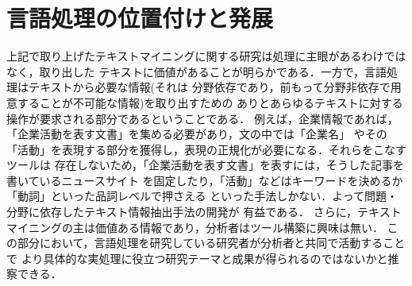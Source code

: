 \documentclass[twocolumn]{jarticle}
\begin{document}
\section{言語処理の位置付けと発展}
上記で取り上げたテキストマイニングに関する研究は処理に主眼があるわけではなく，取り出した
テキストに価値があることが明らかである．一方で，言語処理はテキストから必要な情報(それは
分野依存であり，前もって分野非依存で用意することが不可能な情報)を取り出すための
ありとあらゆるテキストに対する操作が要求される部分であるということである．
例えば，企業情報であれば，「企業活動を表す文書」を集める必要があり，文の中では「企業名」
やその「活動」を表現する部分を獲得し，表現の正規化が必要になる．それらをこなすツールは
存在しないため，「企業活動を表す文書」を表すには，そうした記事を書いているニュースサイト
を固定したり，「活動」などはキーワードを決めるか「動詞」といった品詞レベルで押さえる
といった手法しかない．よって問題・分野に依存したテキスト情報抽出手法の開発が
有益である．
さらに，テキストマイニングの主は価値ある情報であり，分析者はツール構築に興味は無い．
この部分において，言語処理を研究している研究者が分析者と共同で活動することで
より具体的な実処理に役立つ研究テーマと成果が得られるのではないかと推察できる．




\end{document}
